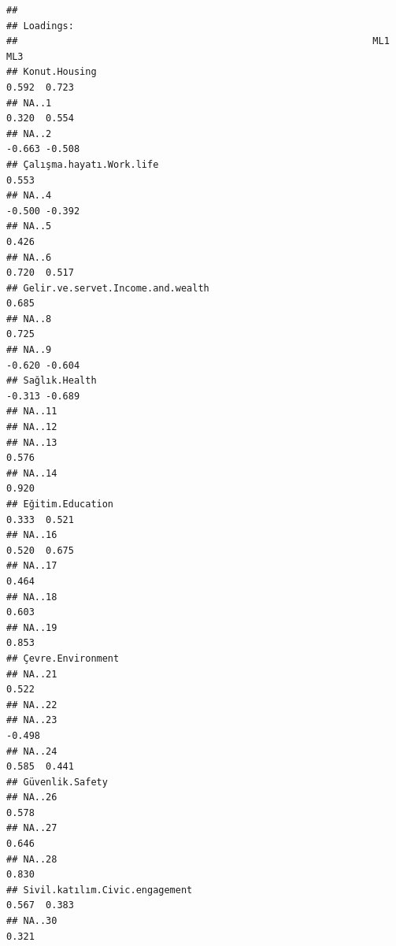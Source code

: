 \documentclass[
]{article}
\begin{document}
\begin{verbatim}
## 
## Loadings:
##                                                               ML1    ML3   
## Konut.Housing                                                  0.592  0.723
## NA..1                                                          0.320  0.554
## NA..2                                                         -0.663 -0.508
## Çalışma.hayatı.Work.life                                              0.553
## NA..4                                                         -0.500 -0.392
## NA..5                                                                 0.426
## NA..6                                                          0.720  0.517
## Gelir.ve.servet.Income.and.wealth                                     0.685
## NA..8                                                                 0.725
## NA..9                                                         -0.620 -0.604
## Sağlık.Health                                                 -0.313 -0.689
## NA..11                                                                     
## NA..12                                                                     
## NA..13                                                         0.576       
## NA..14                                                         0.920       
## Eğitim.Education                                               0.333  0.521
## NA..16                                                         0.520  0.675
## NA..17                                                         0.464       
## NA..18                                                                0.603
## NA..19                                                         0.853       
## Çevre.Environment                                                          
## NA..21                                                                0.522
## NA..22                                                                     
## NA..23                                                        -0.498       
## NA..24                                                         0.585  0.441
## Güvenlik.Safety                                                            
## NA..26                                                         0.578       
## NA..27                                                         0.646       
## NA..28                                                         0.830       
## Sivil.katılım.Civic.engagement                                 0.567  0.383
## NA..30                                                         0.321       

\end{verbatim}
\end{document}
